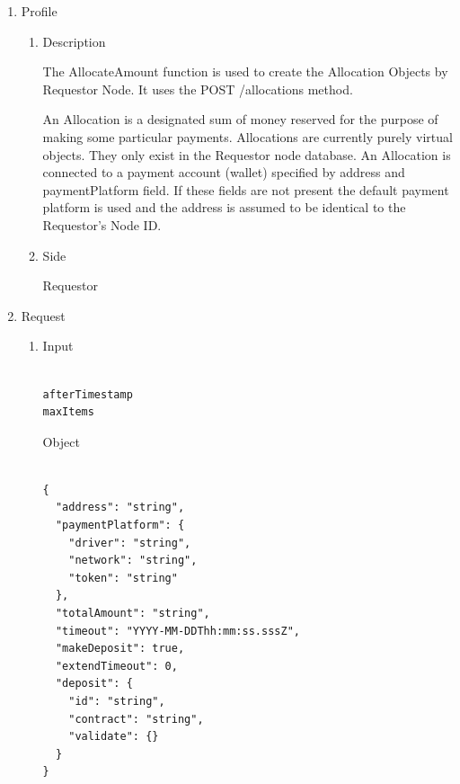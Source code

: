 \newpage



\begin{enumerate}

\item Profile

\begin{enumerate}

\item Description

The AllocateAmount function is used to create the Allocation Objects by Requestor Node. 
It uses the POST /allocations method.

An Allocation is a designated sum of money reserved for the purpose of making some particular payments. 
Allocations are currently purely virtual objects. They only exist in the Requestor node database.
An Allocation is connected to a payment account (wallet) specified by address and paymentPlatform field. 
If these fields are not present the default payment platform is used and the address is assumed 
to be identical to the Requestor's Node ID.

 
\item Side

Requestor

\end{enumerate}

\item Request

\begin{enumerate}

\item Input

\begin{tcolorbox}[boxrule=0pt, frame empty]
\begin{verbatim}

afterTimestamp
maxItems

\end{verbatim}
\end{tcolorbox}

Object
\begin{tcolorbox}[boxrule=0pt, frame empty]
\begin{verbatim}

{
  "address": "string",
  "paymentPlatform": {
    "driver": "string",
    "network": "string",
    "token": "string"
  },
  "totalAmount": "string",
  "timeout": "YYYY-MM-DDThh:mm:ss.sssZ",
  "makeDeposit": true,
  "extendTimeout": 0,
  "deposit": {
    "id": "string",
    "contract": "string",
    "validate": {}
  }
}


\end{verbatim}
\end{tcolorbox}
\end{enumerate}
\end{enumerate}
